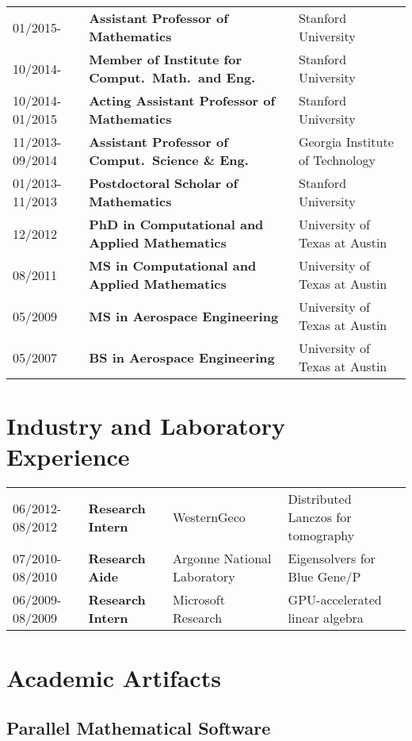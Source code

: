 \documentclass[letterpaper]{article}
\begin{document}
\begin{tabular}{lll}
01/2015-        & {\bf Assistant Professor of Mathematics}               & Stanford University \\
10/2014-        & {\bf Member of Institute for Comput.\ Math.\ and Eng.} & Stanford University \\
10/2014-01/2015 & {\bf Acting Assistant Professor of Mathematics}        & Stanford University \\
11/2013-09/2014 & {\bf Assistant Professor of Comput.\ Science \& Eng. } & Georgia Institute of Technology \\
01/2013-11/2013 & {\bf Postdoctoral Scholar of Mathematics}              & Stanford University \\
12/2012         & {\bf PhD in Computational and Applied Mathematics}     & University of Texas at Austin \\
08/2011         & {\bf MS in Computational and Applied Mathematics}      & University of Texas at Austin \\
05/2009         & {\bf MS in Aerospace Engineering}                      & University of Texas at Austin \\
05/2007         & {\bf BS in Aerospace Engineering}                      & University of Texas at Austin \\
\end{tabular}

\section*{Industry and Laboratory Experience}

\begin{tabular}{llll}
06/2012-08/2012 & {\bf Research Intern} & WesternGeco                 & Distributed Lanczos for tomography \\
07/2010-08/2010 & {\bf Research Aide}   & Argonne National Laboratory & Eigensolvers for Blue Gene/P \\
06/2009-08/2009 & {\bf Research Intern} & Microsoft Research          & GPU-accelerated linear algebra \\
\end{tabular}

\section*{Academic Artifacts}

\subsection*{Parallel Mathematical Software}
\end{document}
